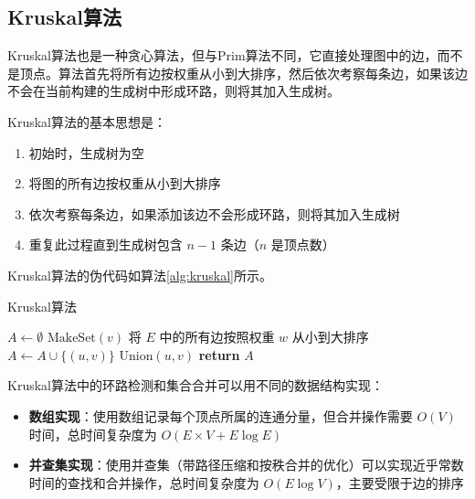 \documentclass[a4paper,12pt]{ctexart}
\begin{document}
\subsection{Kruskal算法}
Kruskal算法也是一种贪心算法，但与Prim算法不同，它直接处理图中的边，而不是顶点。算法首先将所有边按权重从小到大排序，然后依次考察每条边，如果该边不会在当前构建的生成树中形成环路，则将其加入生成树。

Kruskal算法的基本思想是：
\begin{enumerate}
    \item 初始时，生成树为空
    \item 将图的所有边按权重从小到大排序
    \item 依次考察每条边，如果添加该边不会形成环路，则将其加入生成树
    \item 重复此过程直到生成树包含 $n-1$ 条边（$n$ 是顶点数）
\end{enumerate}

Kruskal算法的伪代码如算法\ref{alg:kruskal}所示。

\begin{algorithm}
    \caption{Kruskal算法}\label{alg:kruskal}
    \begin{algorithmic}[1]
    \State $A \gets \emptyset$ 
        \State $\textrm{MakeSet}(v)$ 
    \EndFor
    \State 将 $E$ 中的所有边按照权重 $w$ 从小到大排序
         
            \State $A \gets A \cup \{(u,v)\}$ 
            \State $\textrm{Union}(u, v)$ 
        \EndIf
    \EndFor
    \State \textbf{return} $A$ 
    \EndProcedure
    \end{algorithmic}
\end{algorithm}

Kruskal算法中的环路检测和集合合并可以用不同的数据结构实现：
\begin{itemize}
    \item \textbf{数组实现}：使用数组记录每个顶点所属的连通分量，但合并操作需要 $O(V)$ 时间，总时间复杂度为 $O(E \times V + E \log E)$
    \item \textbf{并查集实现}：使用并查集（带路径压缩和按秩合并的优化）可以实现近乎常数时间的查找和合并操作，总时间复杂度为 $O(E \log V)$，主要受限于边的排序
\end{itemize}
\end{document}
